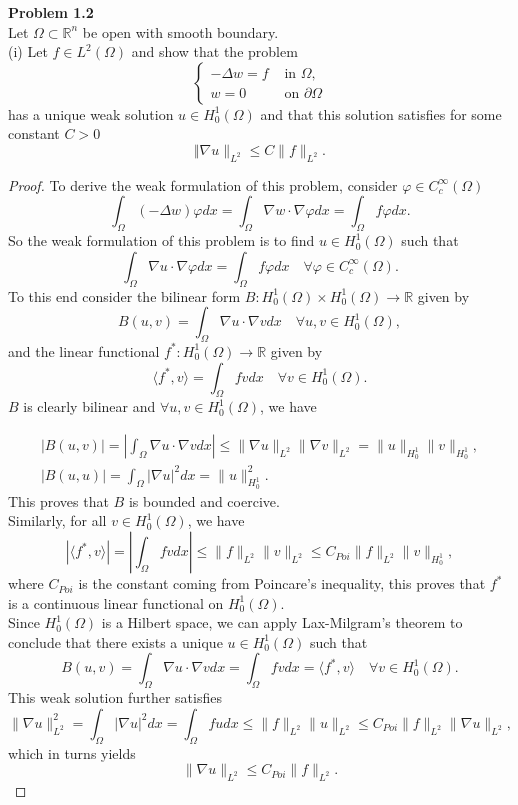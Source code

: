 \documentclass{article}
\newcommand{\R}{\mathbb{R}}
\begin{document}
\textbf{Problem 1.2}\\
Let $\Omega\subset\R^n$ be open with smooth boundary.\\
(i) Let $f\in L^2(\Omega)$ and show that the problem 
\[
\begin{cases}
    -\Delta w=f &\text{ in }\Omega,\\
    w=0 &\text{ on }\partial \Omega
\end{cases}
\]
has a unique weak solution $u\in H_0^1(\Omega)$ and that this solution satisfies for some constant $C>0$
\[
\Vert\nabla u\rVert_{L^2}\leqslant C\lVert f\rVert_{L^2}.
\]
\begin{proof}
    To derive the weak formulation of this problem, consider $\varphi\in C_c^\infty(\Omega)$
    \[
    \int_{\Omega}(-\Delta w)\varphi dx=\int_{\Omega}\nabla w\cdot\nabla\varphi dx=\int_\Omega f\varphi dx.
    \]
    So the weak formulation of this problem is to find $u\in H_0^1(\Omega)$ such that
    \[
    \int_{\Omega}\nabla u\cdot\nabla\varphi dx=\int_{\Omega}f\varphi dx\quad\forall \varphi\in C_c^\infty(\Omega).
    \]
    To this end consider the bilinear form $B:H_0^1(\Omega)\times H_0^1(\Omega)\to\R$ given by
    \[
    B(u,v)=\int_{\Omega}\nabla u\cdot\nabla vdx \quad\forall u,v\in H_0^1(\Omega),
    \]
    and the linear functional $f^*:H_0^1(\Omega)\to\R$ given by
    \[
    \langle f^*,v\rangle=\int_{\Omega}fvdx\quad\forall v\in H_0^1(\Omega).
    \]
    $B$ is clearly bilinear and  $\forall u,v\in H_0^1(\Omega)$, we have
    
    \begin{gather}
        |B(u,v)|=\left|\int_{\Omega}\nabla u\cdot \nabla vdx\right|\leqslant \lVert \nabla u\rVert_{L^2}\lVert \nabla v\rVert_{L^2}=\lVert u\rVert_{H_0^1}\lVert v\rVert_{H_0^1},\\
        |B(u,u)|=\int_{\Omega}|\nabla u|^2dx=\lVert u\rVert_{H_0^1}^2.
    \end{gather}
    This proves that $B$ is bounded and coercive.\\
    Similarly, for all $v\in H_0^1(\Omega)$, we have
    \[
    |\langle f^*,v\rangle|=\left|\int_{\Omega}fvdx\right|\leqslant \lVert f\rVert_{L^2}\lVert v\rVert_{L^2}\leqslant C_{Poi}\lVert f\rVert_{L^2}\lVert v\rVert_{H_0^1},
    \]
    where $C_{Poi}$ is the constant coming from Poincare's inequality, this proves that $f^*$ is a continuous linear functional on $H_0^1(\Omega)$.\\
    Since $H_0^1(\Omega)$ is a Hilbert space, we can apply Lax-Milgram's theorem to conclude that there exists a unique $u\in H_0^1(\Omega)$ such that 
    \[
    B(u,v)=\int_{\Omega}\nabla u\cdot\nabla vdx=\int_{\Omega}fvdx=\langle f^*,v\rangle \quad\forall v\in H_0^1(\Omega).
    \]
    This weak solution further satisfies
    \[
    \lVert \nabla u\rVert_{L^2}^2=\int_{\Omega}|\nabla u|^2dx=\int_{\Omega}fudx\leqslant \lVert f\rVert_{L^2}\lVert u\rVert_{L^2}\leqslant C_{Poi}\lVert f\rVert_{L^2}\lVert \nabla u\rVert_{L^2},
    \]
    which in turns yields
    \[
    \lVert \nabla u\rVert_{L^2}\leqslant C_{Poi}\lVert f\rVert_{L^2}.
    \]
\end{proof}
\end{document}
